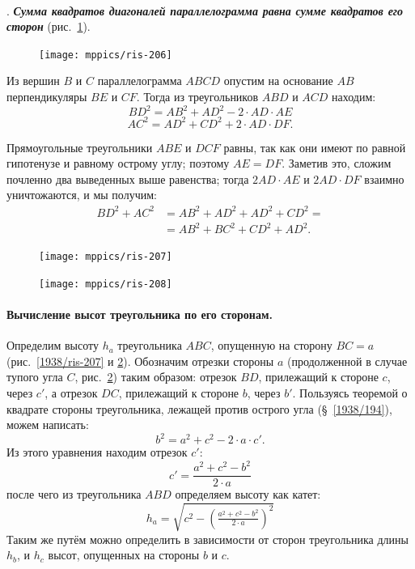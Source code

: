 \documentclass[oneside]{book}
\begin{document}
\paragraph{}\label{1938/197}
.
\textbf{\emph{Сумма квадратов диагоналей параллелограмма равна сумме квадратов его сторон}} (рис.~\ref{1938/ris-206}).

\begin{figure}
\centering
\texttt{[image: mppics/ris-206]}
\caption{}\label{1938/ris-206}
\end{figure}

Из вершин $B$ и $C$ параллелограмма $ABCD$ опустим на основание $AB$ перпендикуляры $BE$ и $CF$.
Тогда из треугольников $ABD$ и $ACD$ находим:
\[BD^2=AB^2+AD^2-2\cdot AD\cdot AE\]
\[AC^2=AD^2+CD^2+2\cdot AD\cdot  DF.\]

Прямоугольные треугольники $ABE$ и $DCF$ равны, так как они имеют по равной гипотенузе и равному острому углу;
поэтому $AE=DF$.
Заметив это, сложим почленно два выведенных выше равенства;
тогда $2AD\cdot  AE$ и $2AD\cdot  DF$ взаимно уничтожаются, и мы получим:
\begin{align*}
BD^2+AC^2&=AB^2+AD^2+AD^2+CD^2=
\\
&=AB^2+BC^2+CD^2+AD^2.
\end{align*}

\begin{figure}
\centering
\texttt{[image: mppics/ris-207]}
\caption{}\label{1938/ris-207}
\bigskip
\texttt{[image: mppics/ris-208]}
\caption{}\label{1938/ris-208}
\end{figure}

\paragraph{Вычисление высот треугольника по его сторонам.}\label{1938/198}
Определим высоту $h_a$ треугольника $ABC$, опущенную на сторону $BC=a$ (рис.~\ref{1938/ris-207} и \ref{1938/ris-208}).
Обозначим отрезки стороны $a$ (продолженной в случае тупого угла $C$, рис.~\ref{1938/ris-208}) таким образом:
отрезок $BD$, прилежащий к стороне $c$, через $c'$, а отрезок $DC$, прилежащий к стороне $b$, через $b'$.
Пользуясь теоремой о квадрате стороны треугольника, лежащей против острого угла (§~\ref{1938/194}), можем написать:
\[b^2=a^2+c^2-2\cdot a\cdot c'.\]
Из этого уравнения находим отрезок $c'$:
\[c'=\frac{a^2+c^2-b^2}{2\cdot a}\]
после чего из треугольника $ABD$ определяем высоту как катет:
\[h_a=\sqrt{c^2-\left(\tfrac{a^2+c^2-b^2}{2\cdot a}\right)^2}\]
Таким же путём можно определить в зависимости от сторон треугольника длины $h_b$, и $h_c$ высот, опущенных на стороны $b$ и $c$.
\end{document}
